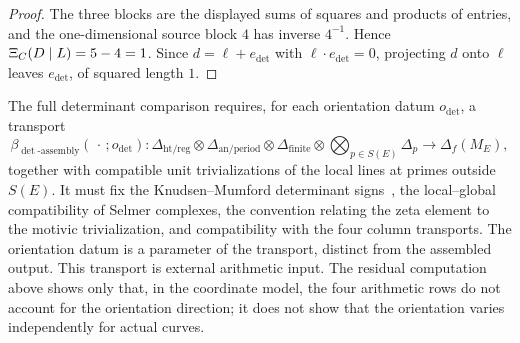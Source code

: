 \begin{proof}
The three blocks are the displayed sums of squares and products of
entries, and the one-dimensional source block $4$ has inverse $4^{-1}$.
Hence $\Xi_C(D\mid L)=5-4=1$.  Since $d=\ell+e_{\det}$ with $\ell\cdot e_{\det}=0$,
projecting $d$ onto $\ell$ leaves $e_{\det}$, of squared length $1$.
\end{proof}

\begin{obligation}\label{obl:apparatus:rho-det-assembly}
The full determinant comparison requires, for each orientation datum
$o_{\det}$, a transport
\[
  \beta_{\det\text{-}\mathrm{assembly}}(\,\cdot\,;o_{\det}):
  \Delta_{\mathrm{ht/reg}}
  \otimes
  \Delta_{\mathrm{an/period}}
  \otimes
  \Delta_{\mathrm{finite}}
  \otimes
  \bigotimes_{p\in S(E)}\Delta_p
  \longrightarrow
  \Delta_f(M_E),
\]
together with compatible unit trivializations of the local lines at primes
outside $S(E)$.  It must fix the Knudsen--Mumford determinant
signs~\citep{KnudsenMumford1976}, the local--global compatibility of
Selmer complexes, the convention relating the zeta element to the
motivic trivialization, and compatibility with the four column
transports.  The orientation datum is a parameter of the transport,
distinct from the assembled output.  This transport is external
arithmetic input.  The residual computation above shows only that, in the
coordinate model, the four arithmetic rows do not account for the
orientation direction; it does not show that the orientation varies
independently for actual curves.
\end{obligation}

